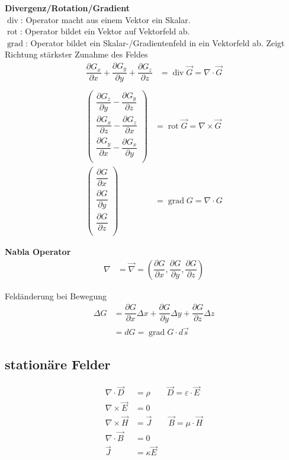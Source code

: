 \textbf{Divergenz/Rotation/Gradient}\\
$\operatorname{div}$: Operator macht aus einem Vektor ein Skalar.\\
$\operatorname{rot}$: Operator bildet ein Vektor auf Vektorfeld ab.\\
$\operatorname{grad}$: Operator bildet ein Skalar-/Gradientenfeld in ein Vektorfeld ab.
Zeigt Richtung stärkster Zunahme des Feldes
\begin{align*}
    \dfrac{\partial G_x}{\partial x} + \dfrac{\partial G_y}{\partial y} + \dfrac{\partial G_z}{\partial z} &= \operatorname{div} \vec{G} = \nabla \cdot \vec{G}\\
\end{align*}
\begin{align*}
    \begin{pmatrix}
        \dfrac{\partial G_z}{\partial y} - \dfrac{\partial G_y}{\partial z}\\
        \dfrac{\partial G_x}{\partial z} - \dfrac{\partial G_z}{\partial x}\\
        \dfrac{\partial G_y}{\partial x} - \dfrac{\partial G_x}{\partial y}\\
    \end{pmatrix} &= \operatorname{rot} \vec{G} = \nabla \times \vec{G}\\
    \begin{pmatrix}
        \dfrac{\partial G}{\partial x}\\
        \dfrac{\partial G}{\partial y}\\
        \dfrac{\partial G}{\partial z}\\
    \end{pmatrix} &= \operatorname{grad} G = \nabla \cdot G
\end{align*}

\textbf{Nabla Operator}
\begin{align*}
    \nabla &= \vec{\nabla} = \left( \dfrac{\partial G}{\partial x}, \dfrac{\partial G}{\partial y}, \dfrac{\partial G}{\partial z} \right)
\end{align*}

Feldänderung bei Bewegung
\begin{align*}
    \Delta G &= \dfrac{\partial G}{\partial x} \Delta x + \dfrac{\partial G}{\partial y} \Delta y + \dfrac{\partial G}{\partial z} \Delta z \\
             &= dG = \operatorname{grad} G \cdot d \vec{s}
\end{align*}

\subsection{stationäre Felder}
\begin{align*}
    \nabla \cdot \vec{D} &= \rho \qquad \vec{D} = \varepsilon \cdot \vec{E}\\
    \nabla \times \vec{E} &= 0\\
    \nabla \times \vec{H} &= \vec{J} \qquad \vec{B} = \mu \cdot \vec{H}\\
    \nabla \cdot \vec{B} &= 0\\
    \vec{J} &= \kappa \vec{E}
\end{align*}

